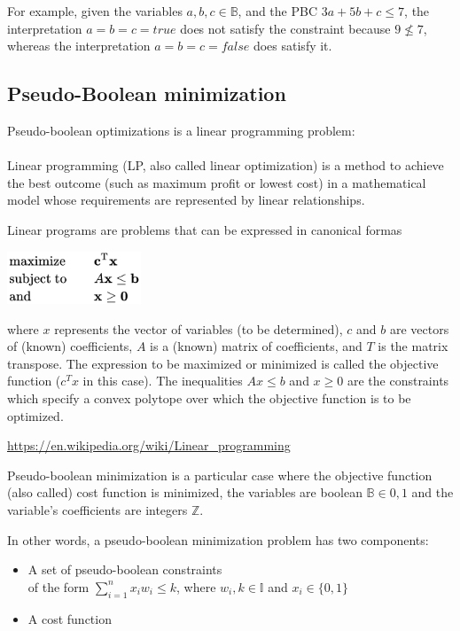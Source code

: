 For example, given the variables $a,b,c \in \mathbb{B}$, and the PBC $3a+5b+c \leq 7$, the interpretation $a = b = c = true$ does not satisfy the constraint because $ 9 \nleq 7 $, whereas the interpretation $a =b =c = false$ does satisfy it.


\subsection{Pseudo-Boolean minimization}
Pseudo-boolean optimizations is a linear programming problem: \\\\
\noindent\makebox[\linewidth]{\rule{\linewidth}{0.4pt}}
Linear programming (LP, also called linear optimization) is a method to achieve the best
outcome (such as maximum profit or lowest cost) in a mathematical model whose requirements
are represented by linear relationships. 

Linear programs are problems that can be expressed in canonical formas

\begin{center}
	\includegraphics[width=0.3\textwidth]{Figures/linearProgramming.png}
\end{center}

where $x$ represents the vector of variables (to be determined), $c$ and $b$ are vectors of (known) coefficients, $A$ is a (known) matrix of coefficients, and $T$ is the matrix transpose. The expression to be maximized or minimized is called the objective function ($c^Tx$ in this case). The inequalities $Ax \leq b $ and $x \geq 0$ are the constraints which specify a convex polytope over which the
objective function is to be optimized.
\begin{center}
	\href{https://en.wikipedia.org/wiki/Linear\_programming}{https://en.wikipedia.org/wiki/Linear\_programming}
\end{center}
\noindent\makebox[\linewidth]{\rule{\linewidth}{0.4pt}}


Pseudo-boolean minimization is a particular case where the objective function (also called) cost function is minimized, the variables are boolean $\mathbb{B} \in {0,1}$ and the variable’s coefficients are integers $\mathbb{Z}$.  

In other words, a pseudo-boolean minimization problem has two components: 
\begin{itemize}
	\item A set of pseudo-boolean constraints \\
	of the form $\sum_{i=1}^{n} x_{i}w_{i} \leq k$, where $w_{i},k \in \mathbb{I}$ and $x_{i} \in \{0,1\}$
	\item A cost function
\end{itemize}

